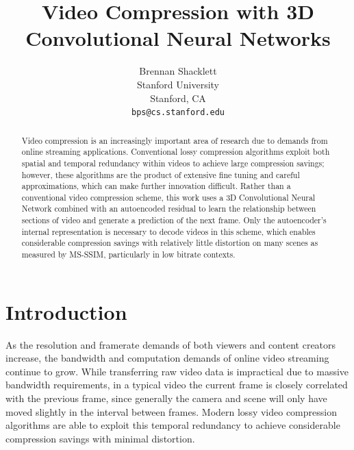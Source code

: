 \documentclass[10pt,twocolumn,letterpaper]{article}
\begin{document}
\title{Video Compression with 3D Convolutional Neural Networks}

\author{Brennan Shacklett\\
Stanford University\\
Stanford, CA\\
{\tt\small bps@cs.stanford.edu}
}

\maketitle

\begin{abstract}
  Video compression is an increasingly important area of research due to demands from online streaming applications. Conventional lossy compression algorithms exploit both spatial and temporal redundancy within videos to achieve large compression savings; however, these algorithms are the product of extensive fine tuning and careful approximations, which can make further innovation difficult. Rather than a conventional video compression scheme, this work uses a 3D Convolutional Neural Network combined with an autoencoded residual to learn the relationship between sections of video and generate a prediction of the next frame. Only the autoencoder's internal representation is necessary to decode videos in this scheme, which enables considerable compression savings with relatively little distortion on many scenes as measured by MS-SSIM, particularly in low bitrate contexts.
\end{abstract}

\section{Introduction}

As the resolution and framerate demands of both viewers and content creators increase, the bandwidth and computation demands of online video streaming continue to grow. While transferring raw video data is impractical due to massive bandwidth requirements, in a typical video the current frame is closely correlated with the previous frame, since generally the camera and scene will only have moved slightly in the interval between frames. Modern lossy video compression algorithms are able to exploit this temporal redundancy to achieve considerable compression savings with minimal distortion.
\end{document}
